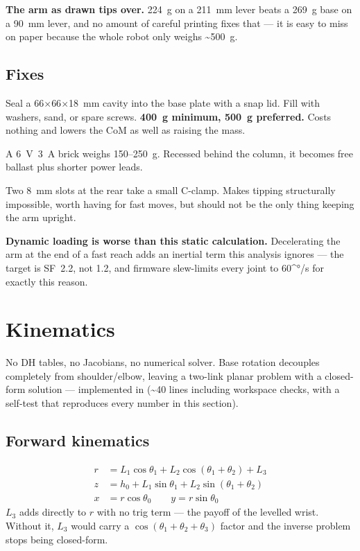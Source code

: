 \documentclass[11pt]{article}
\newcommand{\code}[1]{\texttt{\detokenize{#1}}}
\newcommand{\degsym}{\ifmmode{}^{\circ}\else°\fi}
\begin{document}
\textbf{The arm as drawn tips over.} 224~g on a 211~mm lever beats a 269~g base on a 90~mm lever, and no amount of careful printing fixes that --- it is easy to miss on paper because the whole robot only weighs \textasciitilde500~g.

\subsection{Fixes}
\begin{description}[leftmargin=1.4em,style=nextline]
\item[Ballast the base --- primary] Seal a 66$\times$66$\times$18~mm cavity into the base plate with a snap lid. Fill with washers, sand, or spare screws. \textbf{400~g minimum, 500~g preferred.} Costs nothing and lowers the CoM as well as raising the mass.
\item[Park the supply on the plate] A 6~V~3~A brick weighs 150--250~g. Recessed behind the column, it becomes free ballast plus shorter power leads.
\item[Clamp it down --- optional] Two 8~mm slots at the rear take a small C-clamp. Makes tipping structurally impossible, worth having for fast moves, but should not be the only thing keeping the arm upright.
\end{description}

\textbf{Dynamic loading is worse than this static calculation.} Decelerating the arm at the end of a fast reach adds an inertial term this analysis ignores --- the target is SF~2.2, not 1.2, and firmware slew-limits every joint to 60\degsym/s for exactly this reason.

\section{Kinematics}
\label{sec:kinematics}

No DH tables, no Jacobians, no numerical solver. Base rotation decouples completely from shoulder/elbow, leaving a two-link planar problem with a closed-form solution --- implemented in \code{software/robot/kinematics.py} (\textasciitilde40 lines including workspace checks, with a self-test that reproduces every number in this section).

\subsection{Forward kinematics}
\begin{align*}
r &= L_1\cos\theta_1 + L_2\cos(\theta_1{+}\theta_2) + L_3 \\
z &= h_0 + L_1\sin\theta_1 + L_2\sin(\theta_1{+}\theta_2) \\
x &= r\cos\theta_0 \qquad y = r\sin\theta_0
\end{align*}
$L_3$ adds directly to $r$ with no trig term --- the payoff of the levelled wrist. Without it, $L_3$ would carry a $\cos(\theta_1{+}\theta_2{+}\theta_3)$ factor and the inverse problem stops being closed-form.
\end{document}
